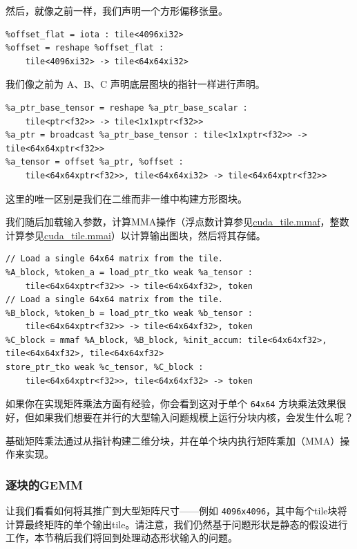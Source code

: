 \documentclass{article}
\begin{document}
然后，就像之前一样，我们声明一个方形偏移张量。


\begin{lstlisting}
%offset_flat = iota : tile<4096xi32>
%offset = reshape %offset_flat :
    tile<4096xi32> -> tile<64x64xi32>
\end{lstlisting}

我们像之前为 A、B、C 声明底层图块的指针一样进行声明。


\begin{lstlisting}
%a_ptr_base_tensor = reshape %a_ptr_base_scalar :
    tile<ptr<f32>> -> tile<1x1xptr<f32>>
%a_ptr = broadcast %a_ptr_base_tensor : tile<1x1xptr<f32>> -> tile<64x64xptr<f32>>
%a_tensor = offset %a_ptr, %offset :
    tile<64x64xptr<f32>>, tile<64x64xi32> -> tile<64x64xptr<f32>>
\end{lstlisting}

这里的唯一区别是我们在二维而非一维中构建方形图块。


我们随后加载输入参数，计算MMA操作（浮点数计算参见\href{https://docs.nvidia.com/cuda/tile-ir/latest/sections/operations.html#op-cuda-tile-mmaf}{cuda\_tile.mmaf}，整数计算参见\href{https://docs.nvidia.com/cuda/tile-ir/latest/sections/operations.html#op-cuda-tile-mmai}{cuda\_tile.mmai}）以计算输出图块，然后将其存储。


\begin{lstlisting}
// Load a single 64x64 matrix from the tile.
%A_block, %token_a = load_ptr_tko weak %a_tensor :
    tile<64x64xptr<f32>> -> tile<64x64xf32>, token
// Load a single 64x64 matrix from the tile.
%B_block, %token_b = load_ptr_tko weak %b_tensor :
    tile<64x64xptr<f32>> -> tile<64x64xf32>, token
%C_block = mmaf %A_block, %B_block, %init_accum: tile<64x64xf32>, tile<64x64xf32>, tile<64x64xf32>
store_ptr_tko weak %c_tensor, %C_block :
    tile<64x64xptr<f32>>, tile<64x64xf32> -> token
\end{lstlisting}

如果你在实现矩阵乘法方面有经验，你会看到这对于单个 \texttt{64x64} 方块乘法效果很好，但如果我们想要在并行的大型输入问题规模上运行分块内核，会发生什么呢？


基础矩阵乘法通过从指针构建二维分块，并在单个块内执行矩阵乘加（MMA）操作来实现。



\subsubsection{逐块的GEMM}

让我们看看如何将其推广到大型矩阵尺寸------例如 \texttt{4096x4096}，其中每个tile块将计算最终矩阵的单个输出tile。请注意，我们仍然基于问题形状是静态的假设进行工作，本节稍后我们将回到处理动态形状输入的问题。
\end{document}

